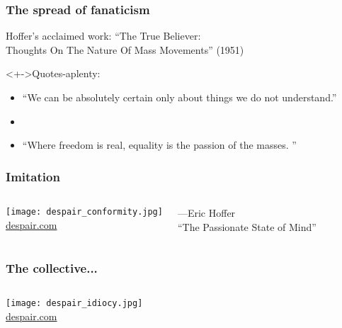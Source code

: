 \begin{frame}
  \frametitle{The spread of fanaticism}

  \begin{block}{}
    Hoffer's acclaimed work:
    \smallskip
    ``\alert{The True Believer}:\\
    Thoughts On The Nature Of Mass Movements'' (1951)\cite{hoffer1951a}
  \end{block}

  \begin{block}<+->{Quotes-aplenty:}
    \begin{itemize}
    \item<+->  ``We can be absolutely certain only about things we do not understand.''
    \item<+-> 
    \item<+-> ``Where freedom is real, equality is the passion of the masses. 
      ''
    \end{itemize}
  \end{block}
  
\end{frame}

\begin{frame}
 \frametitle{Imitation}

 \begin{columns}
   \texttt{[image: despair\_conformity.jpg]}\\
   {\tiny \url{despair.com}}

     \medskip

     ---Eric Hoffer\\
     ``The Passionate State of Mind''\cite{hoffer1954a}
 \end{columns}

\end{frame}

\begin{frame}
  \frametitle{The collective...}
  
 \begin{columns}
   \texttt{[image: despair\_idiocy.jpg]}\\
   {\tiny \url{despair.com}}
 \end{columns}

\end{frame}

